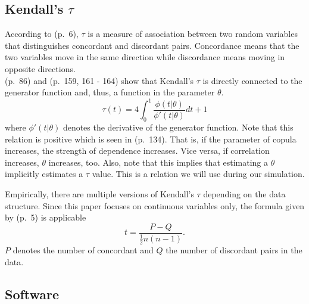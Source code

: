 \documentclass[
]{krantz}
\begin{document}
\subsection{\texorpdfstring{Kendall's \(\tau\)}{Kendall's \textbackslash tau}}\label{kendallstau}

According to \citet{kendall1990} (p.~6), \(\tau\) is a measure of association
between two random variables that distinguishes concordant and
discordant pairs. Concordance means that the two variables move in the same
direction while discordance means moving in opposite directions.\\
\citet{zhang2019} (p.~86) and \citet{nelsen2006} (p.~159,
161 - 164) show that Kendall's \(\tau\) is directly connected to the generator function and, thus,
a function in the parameter \(\theta\).
\[
\tau(t)= 4 \int_0^1 \frac{\phi(t|\theta)}{\phi'(t|\theta)}dt + 1
\label{eq:cKendall}
\]
where \(\phi'(t|\theta)\) denotes the derivative of the generator function. Note that this relation is positive
which is seen in \citet{zhang2019} (p.~134). That is, if the parameter of copula increases, the strength of dependence
increases. Vice versa, if correlation increases, \(\theta\) increases, too. Also, note that this implies that
estimating a \(\theta\) implicitly estimates a \(\tau\) value.
This is a relation we will use during our simulation.

Empirically, there are multiple versions of Kendall's \(\tau\) depending
on the data structure. Since this paper focuses on continuous variables
only, the formula given by \citet{kendall1990} (p.~5) is applicable
\[
t = \frac{P-Q}{\frac{1}{2}n(n-1)}.
\label{eq:eKendall}
\]
\(P\) denotes the number of concordant and \(Q\) the number of
discordant pairs in the data.

\subsection{Software}\label{software}
\end{document}
